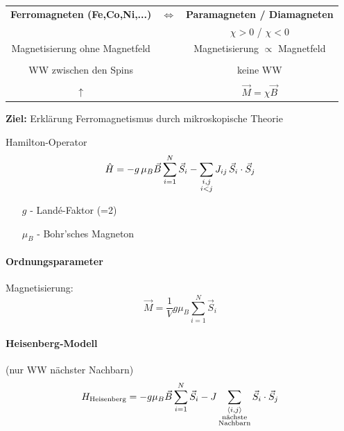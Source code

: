 \begin{tabular}{ccc}
     \textbf{Ferromagneten (Fe,Co,Ni,...)} & $\Leftrightarrow$ & \textbf{Paramagneten / Diamagneten }  \\
     & & \color{black!40} $\chi > 0$ / $\chi<0$\\
     Magnetisierung ohne Magnetfeld & & Magnetisierung $\propto$ Magnetfeld\\
     &&\\
     WW zwischen den Spins & & keine WW\\
     &&\\
     \textcircled{$\uparrow$} & &$\Vec{M} = \chi\Vec{B}$
\end{tabular}

\textbf{Ziel:} Erklärung Ferromagnetismus durch mikroskopische Theorie

\begin{prop}{Hamilton-Operator}
    \begin{equation}
        \Hat{H} = - g\, \mu_B \Vec{B} \sum_{i=1}^N \Vec{S}_i - \sum_{\substack{i,j\\i<j}} J_{ij} \, \Vec{S}_i \cdot \Vec{S}_j
    \end{equation}
    \begin{itemize}
        \item[$g$] - Landé-Faktor (=2)
        \item[$\mu_B$] - Bohr'sches Magneton
    \end{itemize}
\end{prop}

\paragraph{Ordnungsparameter} Magnetisierung:
\begin{equation}
    \Vec{M} = \frac{1}{V} g \mu_B \sum_{i=1}^N \Vec{S}_i
\end{equation}

\paragraph{Heisenberg-Modell} (nur WW nächster Nachbarn)
\begin{align}
    H_{\text{Heisenberg}} = -g\mu_B \Vec{B} \sum_{i=1}^N \Vec{S}_i - J \sum_{\substack{\expval{i,j}\\\text{nächste}\\\text{Nachbarn}}} \Vec{S}_i \cdot \Vec{S}_j
\end{align}

